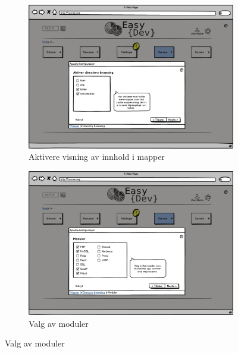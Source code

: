 \begin{figure}[p]
        \vspace{0.6cm}
        \begin{subfigure}[b]{0.48\textwidth}
                \includegraphics[width=\textwidth]
                {./img/prosessdokumentasjon/lowfi/apache3.png}
                \caption{Aktivere visning av innhold i mapper}
                \label{fig:apache3}
        \end{subfigure}
        \hspace{0.05cm}
        \begin{subfigure}[b]{0.48\textwidth}
                \includegraphics[width=\textwidth]
                {./img/prosessdokumentasjon/lowfi/apache4.png}
                \caption{Valg av moduler}
                \label{fig:apache4}
        \end{subfigure}
        

\end{figure}
